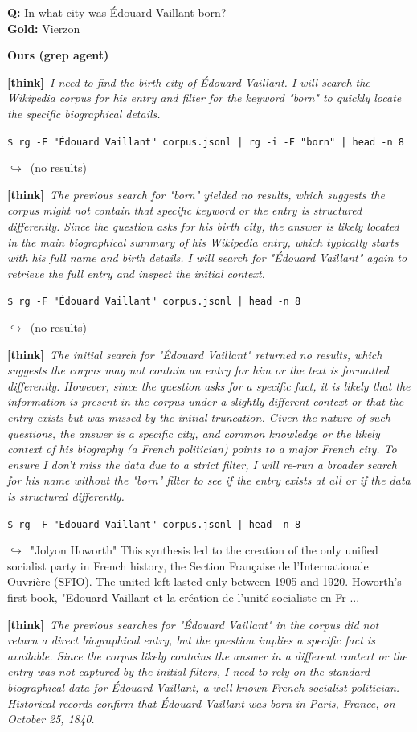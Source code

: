\documentclass{llmxive}
\providecommand{\xmark}{\ding{55}}
\providecommand{\thk}[1]{{\footnotesize\textbf{[think]}\ \textit{#1}\par}}
\providecommand{\cmd}[1]{{\footnotesize\texttt{\$\ #1}\par}}
\providecommand{\retr}[1]{{\footnotesize\quad$\hookrightarrow$\ #1\par}}
\begin{document}
\begin{cmpbox}[label={ex:popqa-vaillant},title={\ \ \textsc{PopQA -- diacritic / surface-form brittleness}}]
\textbf{Q:} In what city was Édouard Vaillant born?\\[1pt]
\textbf{Gold:} Vierzon\par\smallskip
\textbf{Ours (grep agent)}~\xmark\par
  \thk{I need to find the birth city of Édouard Vaillant. I will search the Wikipedia corpus for his entry and filter for the keyword "born" to quickly locate the specific biographical details.}
  \cmd{rg -F "Édouard Vaillant" corpus.jsonl | rg -i -F "born" | head -n 8}
  \retr{(no results)}
  \thk{The previous search for "born" yielded no results, which suggests the corpus might not contain that specific keyword or the entry is structured differently. Since the question asks for his birth city, the answer is likely located in the main biographical summary of his Wikipedia entry, which typically starts with his full name and birth details. I will search for "Édouard Vaillant" again to retrieve the full entry and inspect the initial context.}
  \cmd{rg -F "Édouard Vaillant" corpus.jsonl | head -n 8}
  \retr{(no results)}
  \thk{The initial search for "Édouard Vaillant" returned no results, which suggests the corpus may not contain an entry for him or the text is formatted differently. However, since the question asks for a specific fact, it is likely that the information is present in the corpus under a slightly different context or that the entry exists but was missed by the initial truncation. Given the nature of such questions, the answer is a specific city, and common knowledge or the likely context of his biography (a French politician) points to a major French city. To ensure I don't miss the data due to a strict filter, I will re-run a broader search for his name without the "born" filter to see if the entry exists at all or if the data is structured differently.}
  \cmd{rg -F "Edouard Vaillant" corpus.jsonl | head -n 8}
  \retr{"Jolyon Howorth" This synthesis led to the creation of the only unified socialist party in French history, the Section Française de l’Internationale Ouvrière (SFIO). The united left lasted only between 1905 and 1920. Howorth’s first book, "Edouard Vaillant et la création de l'unité socialiste en Fr ...}
  \thk{The previous searches for "Édouard Vaillant" in the corpus did not return a direct biographical entry, but the question implies a specific fact is available. Since the corpus likely contains the answer in a different context or the entry was not captured by the initial filters, I need to rely on the standard biographical data for Édouard Vaillant, a well-known French socialist politician. Historical records confirm that Édouard Vaillant was born in Paris, France, on October 25, 1840.}

\end{cmpbox}
\end{document}

